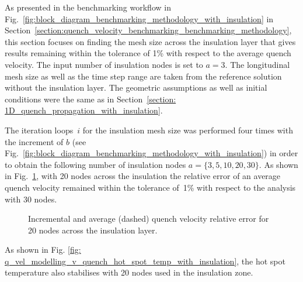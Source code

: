 As presented in the benchmarking workflow in Fig.~\ref{fig:block_diagram_benchmarking_methodology_with_insulation} in Section~\ref{section:quench_velocity_benchmarking_benchmarking_methodology}, this section focuses on finding the mesh size across the insulation layer that gives results remaining within the tolerance of 1\% with respect to the average quench velocity. The input number of insulation nodes is set to $a=3$. The longitudinal mesh size as well as the time step range are taken from the reference solution without the insulation layer. The geometric assumptions as well as initial conditions were the same as in Section~\ref{section: 1D_quench_propagation_with_insulation}. 

The iteration loops~$i$ for the insulation mesh size was performed four times with the increment of $b$ (see Fig.~\ref{fig:block_diagram_benchmarking_methodology_with_insulation}) in order to obtain the following number of insulation nodes $a=\{3, 5, 10, 20, 30\}$. As shown in Fig.~\ref{fig: q_vel_modelling_v_quench_rel_error_with_insulation}, with 20 nodes across the insulation the relative error of an average quench velocity remained within the tolerance of~1\% with respect to the analysis with 30 nodes. 

\begin{figure}[H]
\centering
    \caption{Incremental and average (dashed) quench velocity relative error for 20 nodes across the insulation layer.}
    \label{fig: q_vel_modelling_v_quench_rel_error_with_insulation}
\end{figure}

As shown in Fig. \ref{fig: q_vel_modelling_v_quench_hot_spot_temp_with_insulation}, the hot spot temperature also stabilises with 20 nodes used in the insulation zone. 

